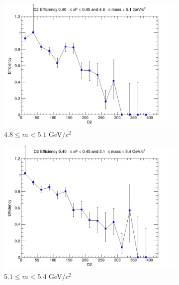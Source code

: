 \documentclass[11pt]{article}
\begin{document}
\begin{figure}[p]
\begin{subfigure}[b]{0.32\textwidth}
        \includegraphics[width=\textwidth]{./kTrackerEfficiencyPlots/D2_Efficiency_xF8_mass2.png}
        \caption{$4.8 \leq m < 5.1$ GeV/$c^2$}
    \end{subfigure}\vspace{0.5cm}
    \begin{subfigure}[b]{0.32\textwidth}
        \centering
        \includegraphics[width=\textwidth]{./kTrackerEfficiencyPlots/D2_Efficiency_xF8_mass3.png}
        \caption{$5.1 \leq m < 5.4$ GeV/$c^2$}
    \end{subfigure}\hfill
    \begin{subfigure}[b]{0.32\textwidth}
        \centering

\end{subfigure}
\end{figure}
\end{document}
